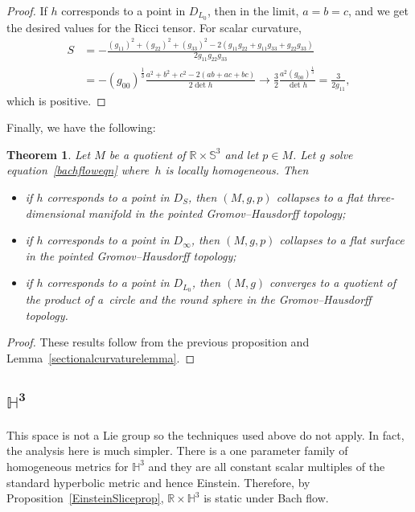 \documentclass[pdftex]{sigma}
\numberwithin{equation}{section}
\newtheorem{Theorem}{Theorem}[section]
\begin{document}
\begin{proof}
If $h$ corresponds to a point in $D_{L_0}$, then in the limit, $a = b = c$, and we get the desired values for the Ricci tensor. For scalar curvature,
\begin{align*}
S &= - \frac{(g_{11})^2 + (g_{22})^2+(g_{33})^2 - 2(g_{11} g_{22} + g_{11} g_{33} + g_{22} g_{33})}
			{2 g_{11} g_{22} g_{33}} \\
	&= -(g_{00})^{\frac{1}{3}} \frac{a^2 + b^2 + c^2 - 2(ab + ac + bc)}{2 \det h}
	\rightarrow \frac{3}{2} \frac{a^2 (g_{00})^{\frac{1}{3}}}{\det h}
	= \frac{3}{2 g_{11}},
\end{align*}
which is positive. %
\end{proof}

Finally, we have the following:

\begin{Theorem} \label{s3convergencethm}Let $M$ be a quotient of $\mathbb{R} \times \mathbb{S}^3$ and let $p \in M$. Let $g$ solve equation~\eqref{bachfloweqn} where~$h$ is locally homogeneous. Then
\begin{itemize}\itemsep=0pt
\item if $h$ corresponds to a point in $D_S$, then $(M, g, p)$ collapses to a flat three-dimensional manifold in the pointed Gromov--Hausdorff topology;
\item if $h$ corresponds to a point in $D_{\infty}$, then $(M, g, p)$ collapses to a flat surface in the pointed Gromov--Hausdorff topology;
\item if $h$ corresponds to a point in $D_{L_0}$, then $(M, g)$ converges to a quotient of the product of a~circle and the round sphere in the Gromov--Hausdorff topology.
\end{itemize}
\end{Theorem}

\begin{proof}These results follow from the previous proposition and Lemma~\ref{sectionalcurvaturelemma}.
\end{proof}

\subsection[$\mathbb{H}^3$]{$\boldsymbol{\mathbb{H}^3}$} This space is not a Lie group so the techniques used above do not apply. In fact, the analysis here is much simpler. There is a one parameter family of homogeneous metrics for $\mathbb{H}^3$ and they are all constant scalar multiples of the standard hyperbolic metric and hence Einstein. Therefore, by Proposition~\ref{EinsteinSliceprop}, $\mathbb{R} \times \mathbb{H}^3$ is static under Bach flow.
\end{document}
